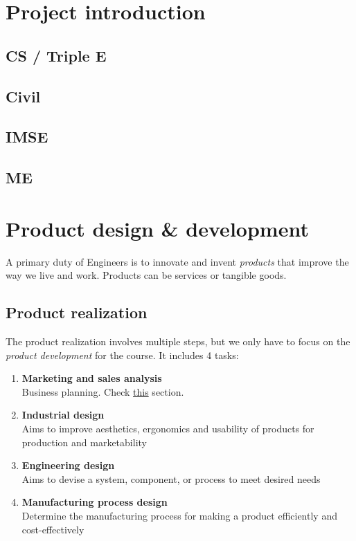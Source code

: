 \documentclass{article}
\begin{document}




\section{Project introduction}
\subsection{CS / Triple E}
\subsection{Civil}
\subsection{IMSE}
\subsection{ME}


\section{Product design \& development}
A primary duty of Engineers is to innovate and invent \emph{products} that improve the way we live and work. Products can be services or tangible goods.
\subsection{Product realization}
The product realization involves multiple steps, but we only have to focus on the \emph{product development} for the course. It includes 4 tasks:
\begin{enumerate}
    \item \textbf{Marketing and sales analysis}\\
          Business planning. Check \hyperref[sec:market]{this} section.
    \item \textbf{Industrial design}\\
          Aims to improve aesthetics, ergonomics and usability of products for production and marketability
    \item \textbf{Engineering design}\\
          Aims to devise a system, component, or process to meet desired needs
    \item \textbf{Manufacturing process design}\\
          Determine the manufacturing process for making a product efficiently and cost-effectively
\end{enumerate}
\end{document}
